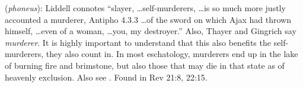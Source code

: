 \item[Murderer,]

(\textit{phoneus}):
Liddell connotes ``slayer, \ldots self-murderers, \ldots is so much more justly accounted a murderer, Antipho 4.3.3 \ldots of the sword on which Ajax had thrown himself, \ldots even of a woman, \ldots you, my destroyer.'' Also, Thayer and Gingrich say \emph{murderer}. It is highly important to understand that this also benefits the self-murderers, they also count in. In most eschatology, murderers end up in the lake of burning fire and brimstone, but also those that may die in that state as of heavenly exclusion. Also see .
Found in Rev 21:8, 22:15.
